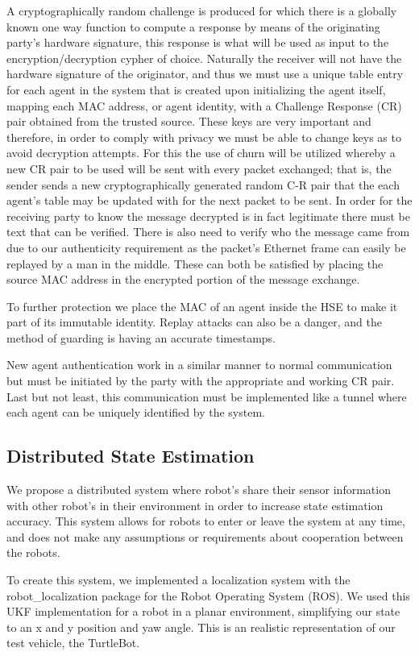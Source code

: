 \documentclass[conference]{IEEEtran}
\begin{document}
A cryptographically random challenge is produced for which there is a globally known one way function to compute a response by means of the originating party's hardware signature, this response is what will be used as input to the encryption/decryption cypher of choice. Naturally the receiver will not have the hardware signature of the originator, and thus we must use a unique table entry for each agent in the system that is created upon initializing the agent itself, mapping each MAC address, or agent identity, with a Challenge Response (CR) pair obtained from the trusted source. These keys are very important and therefore, in order to comply with privacy we must be able to change keys as to avoid decryption attempts. For this the use of churn will be utilized whereby a new CR pair to be used will be sent with every packet exchanged; that is, the sender sends a new cryptographically generated random C-R pair that the each agent's table may be updated with for the next packet to be sent. In order for the receiving party to know the message decrypted is in fact legitimate there must be text that can be verified. There is also need to verify who the message came from due to our authenticity requirement as the packet's Ethernet frame can easily be replayed by a man in the middle. These can both be satisfied by placing the source MAC address in the encrypted portion of the message exchange. 

To further protection we place the MAC of an agent inside the HSE to make it part of its immutable identity. Replay attacks can also be a danger, and the method of guarding is having an accurate timestamps.
	
New agent authentication work in a similar manner to normal communication but must be initiated by the party with the appropriate and working CR pair. Last but not least, this communication must be implemented like a tunnel where each agent can be uniquely identified by the system.

\subsection{Distributed State Estimation}
We propose a distributed system where robot's share their sensor information with other robot's in their environment in order to increase state estimation accuracy. This system allows for robots to enter or leave the system at any time, and does not make any assumptions or requirements about cooperation between the robots.

To create this system, we implemented a localization system with the robot\_localization \cite{Moore2014, Moore} package for the Robot Operating System (ROS). We used this UKF implementation for a robot in a planar environment, simplifying our state to an x and y position and yaw angle. This is an realistic representation of our test vehicle, the TurtleBot.
 
\end{document}
